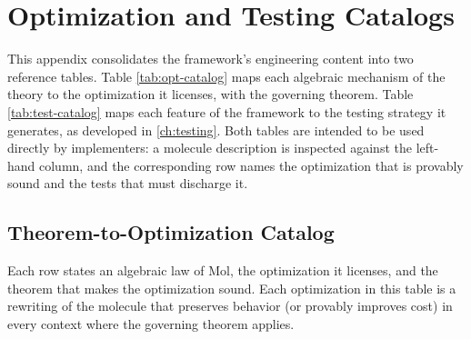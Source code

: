 \chapter{Optimization and Testing Catalogs}\label{app:b}

This appendix consolidates the framework's engineering content into two reference tables. Table \ref{tab:opt-catalog} maps each algebraic mechanism of the theory to the optimization it licenses, with the governing theorem. Table \ref{tab:test-catalog} maps each feature of the framework to the testing strategy it generates, as developed in \autoref{ch:testing}. Both tables are intended to be used directly by implementers: a molecule description is inspected against the left-hand column, and the corresponding row names the optimization that is provably sound and the tests that must discharge it.

\section{Theorem-to-Optimization Catalog}
Each row states an algebraic law of Mol, the optimization it licenses, and the theorem that makes the optimization sound. Each optimization in this table is a rewriting of the molecule that preserves behavior (or provably improves cost) in every context where the governing theorem applies.

